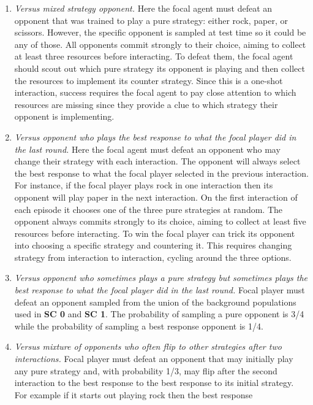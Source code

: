 \documentclass{article} %
\begin{document}
\begin{enumerate}
    \item[\textbf{SC0:}] \textit{Versus mixed strategy opponent.}  Here the
focal agent must defeat an opponent that
was trained to play a pure strategy: either
rock, paper, or scissors. However, the specific opponent is sampled at test time so it
could be any of those. All opponents commit strongly to their choice, aiming to collect at least three resources before interacting. To defeat them, the focal agent should
scout out which pure strategy its opponent
is playing and then collect the resources to
implement its counter strategy. Since this is
a one-shot interaction, success requires the
focal agent to pay close attention to which
resources are missing since they provide
a clue to which strategy their opponent is
implementing.
    \item[\textbf{SC1:}] \textit{Versus opponent who plays the best response to what the focal player did in the last round.} Here the focal agent must defeat an opponent
who may change their strategy with
each interaction. The opponent will always
select the best response to what the focal
player selected in the previous interaction.
For instance, if the focal player plays rock
in one interaction then its opponent will
play paper in the next interaction. On the
first interaction of each episode it chooses
one of the three pure strategies at random.
The opponent always commits strongly to
its choice, aiming to collect at least five resources
before interacting. To win the focal
player can trick its opponent into choosing
a specific strategy and countering it. This
requires changing strategy from interaction
to interaction, cycling around the three options. 
    \item[\textbf{SC2:}] \textit{Versus opponent who sometimes plays a pure
strategy but sometimes plays the best response
to what the focal player did in the
last round.} Focal player must defeat an
opponent sampled from the union of the
background populations used in \textbf{SC 0} and
\textbf{SC 1}. The probability of sampling a pure
opponent is 3/4 while the probability of
sampling a best response opponent is 1/4.
    \item[\textbf{SC3:}] \textit{Versus mixture of opponents who often flip to
other strategies after two interactions.}
Focal
player must defeat an opponent that may
initially play any pure strategy and, with
probability 1/3, may flip after the second
interaction to the best response to the best
response to its initial strategy. For example
if it starts out playing rock then the best response

\end{enumerate}
\end{document}

